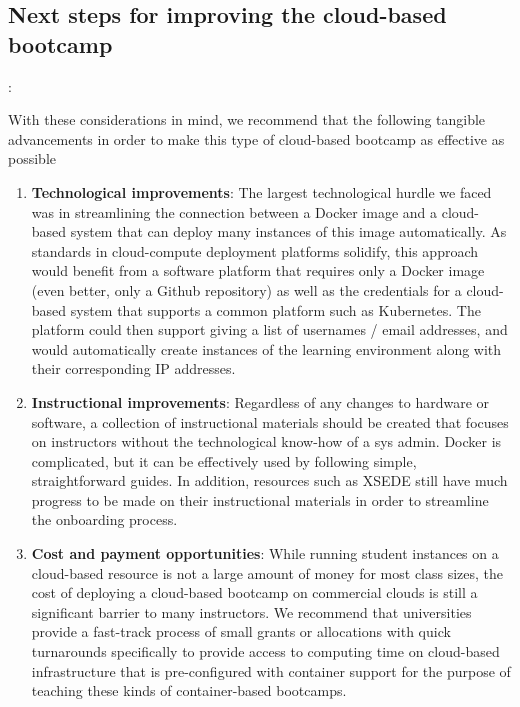 \subsection{Next steps for improving the cloud-based bootcamp}:

With these considerations in mind, we recommend that the following tangible
advancements in order to make this type of cloud-based bootcamp as effective
as possible

\begin{enumerate}

\item {\bf Technological improvements}: The largest technological hurdle we
faced was in streamlining the connection between a Docker image and a
cloud-based system that can deploy many instances of this image automatically.
As standards in cloud-compute deployment platforms solidify, this approach would
benefit from a software platform that requires only a Docker image (even better,
only a Github repository) as well as the credentials for a cloud-based system
that supports a common platform such as Kubernetes. The platform could then
support giving a list of usernames / email addresses, and would automatically
create instances of the learning environment along with their corresponding IP
addresses.

\item {\bf Instructional improvements}: Regardless of any changes to hardware
or software, a collection of instructional materials should be created that
focuses on instructors without the technological know-how of a sys admin.
Docker is complicated, but it can be effectively used by following simple,
straightforward guides. In addition, resources such as XSEDE still have
much progress to be made on their instructional materials in order to
streamline the onboarding process.

\item {\bf Cost and payment opportunities}: While running student instances on a
cloud-based resource is not a large amount of money for most class sizes, the
cost of deploying a cloud-based bootcamp on commercial clouds is still a
significant barrier to many instructors. We recommend that universities provide
a fast-track process of small grants or allocations with quick turnarounds
specifically to provide access to computing time on cloud-based infrastructure
that is pre-configured with container support for the purpose of teaching
these kinds of container-based bootcamps.

\end{enumerate}
